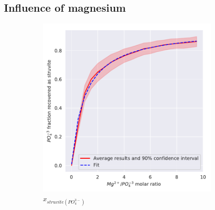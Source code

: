 \begin{refsection}[referencesCh3]
\subsection{Influence of magnesium} 
\begin{figure}[h] 
	\centering
	\begin{subfigure}[t]{0.25\textheight}
		\includegraphics[width=\textwidth]{gfx/AppendixB/plotStrYield_Mg}
		\caption{$x_{struvite \left(PO_{4}^{3-}\right)}$}
		\label{fig:estimation_Mg_value}
	\end{subfigure}
	\begin{subfigure}[t]{0.25\textheight}

\end{subfigure}
\end{figure}
\end{refsection}
